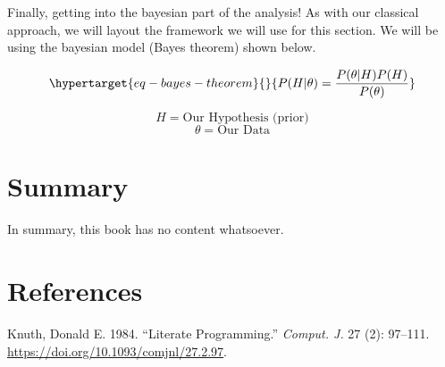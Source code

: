 \documentclass[
  letterpaper,
  DIV=11,
  numbers=noendperiod]{scrreprt}
\newlength{\cslhangindent}
\newlength{\cslentryspacingunit} %
\newenvironment{CSLReferences}[2] %
 {%
  \setlength{\parindent}{0pt}
  \ifodd #1
  \let\oldpar\par
  \def\par{\hangindent=\cslhangindent\oldpar}
  \fi
  \setlength{\parskip}{#2\cslentryspacingunit}
 }%
 {}
\begin{document}
Finally, getting into the bayesian part of the analysis! As with our
classical approach, we will layout the framework we will use for this
section. We will be using the bayesian model (Bayes theorem) shown
below.

\begin{equation}\protect\hypertarget{eq-bayes-theorem}{}{P(H|\theta) = \frac{P(\theta|H) P(H)}{P(\theta)}}\label{eq-bayes-theorem}\end{equation}

\[H = \text{Our Hypothesis (prior)}\] \[\theta = \text{Our Data}\]


\hypertarget{summary}{%
\chapter{Summary}\label{summary}}

In summary, this book has no content whatsoever.


\hypertarget{references}{%
\chapter*{References}\label{references}}


\hypertarget{refs}{}
\begin{CSLReferences}{1}{0}
\leavevmode{}%
Knuth, Donald E. 1984. {``Literate Programming.''} \emph{Comput. J.} 27
(2): 97--111. \url{https://doi.org/10.1093/comjnl/27.2.97}.

\end{CSLReferences}
\end{document}
